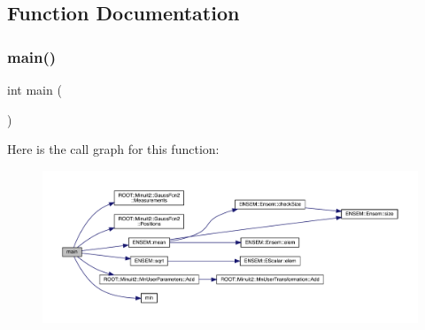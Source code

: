 \subsection{Function Documentation}
\mbox{\label{adat-devel_2other__libs_2minuit_2test_2MnSim_2PaulTest3_8cxx_ae66f6b31b5ad750f1fe042a706a4e3d4}} 
\subsubsection{\texorpdfstring{main()}{main()}}
{\footnotesize\ttfamily int main (\begin{DoxyParamCaption}{ }\end{DoxyParamCaption})}

Here is the call graph for this function\+:
\nopagebreak
\begin{figure}[H]
\begin{center}
\leavevmode
\includegraphics[width=350pt]{d9/d87/adat-devel_2other__libs_2minuit_2test_2MnSim_2PaulTest3_8cxx_ae66f6b31b5ad750f1fe042a706a4e3d4_cgraph}
\end{center}
\end{figure}
